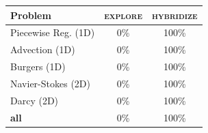\begin{tabular}{lcc}
\toprule
Problem & \textsc{explore} & \textsc{hybridize} \\
\midrule
Piecewise Reg. (1D) & 0\% & 100\% \\
Advection (1D) & 0\% & 100\% \\
Burgers (1D) & 0\% & 100\% \\
Navier-Stokes (2D) & 0\% & 100\% \\
Darcy (2D) & 0\% & 100\% \\
\midrule
\textbf{all} & 0\% & 100\% \\
\bottomrule
\end{tabular}